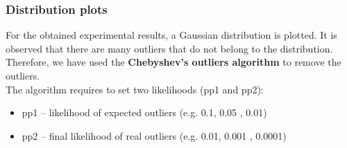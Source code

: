 \documentclass[11pt,a4paper]{article}
\begin{document}
				\subsubsection{Distribution plots} 
				For the obtained experimental results, a Gaussian distribution is plotted. It is observed that there are many outliers that do not belong to the distribution. Therefore, we have used the \textbf{Chebyshev's outliers algorithm} to remove the outliers.\\
				The algorithm requires to set two likelihoods (pp1 and pp2):\begin{itemize}
					\item 	pp1 -- likelihood of expected outliers (e.g. 0.1, 0.05 , 0.01)
					\item pp2 -- final likelihood of real outliers (e.g. 0.01, 0.001 , 0.0001)
				\end{itemize}
				
\end{document}
